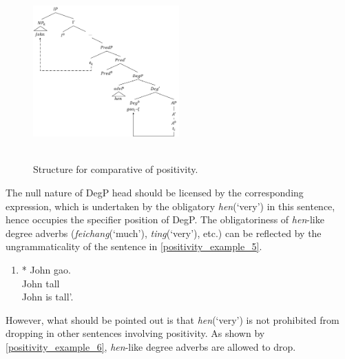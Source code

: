 \documentclass{ctexart}
\begin{document}
\begin{figure}[H]
    \centering
    \includegraphics[width=0.5\textwidth]{pic/positive_structure.png}
    \begin{caption}
        \\ \vspace{-1.1ex}
        Structure for comparative of positivity.
    \end{caption}
\end{figure}

The null nature of DegP head should be licensed by the corresponding expression, which is undertaken by the obligatory \textit{hen}(`very') in this sentence, hence occupies the specifier position of DegP. The obligatoriness of \textit{hen}-like degree adverbs (\textit{feichang}(`much'), \textit{ting}(`very'), etc.) can be reflected by the ungrammaticality of the sentence in \ref{positivity_example_5}.

\begin{enumerate}
    \item \label{positivity_example_5}
    * John gao.  \\
    \hspace*{0.5em} John tall \\
    \hspace*{0.5em} John is tall'.
\end{enumerate}

However, what should be pointed out is that \textit{hen}(`very') is not prohibited from dropping in other sentences involving positivity. As shown by \ref{positivity_example_6}, \textit{hen}-like degree adverbs are allowed to drop.
\end{document}
